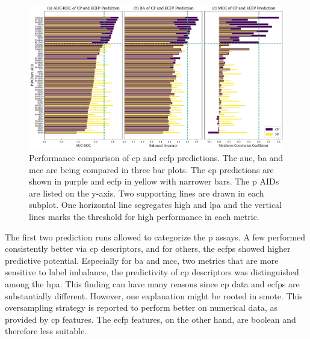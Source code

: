 \begin{figure}[H]
	\centering
	\includegraphics[width=\textwidth]{figures/cp_fp_comparison.pdf}
	\caption[Performance Comparison of \ac{cp} and \ac{ecfp} Predictions]{Performance comparison of \ac{cp} and \ac{ecfp} predictions. The \ac{auc}, \acf{ba} and \acf{mcc} are being compared in three bar plots. The \ac{cp} predictions are shown in purple and \ac{ecfp} in yellow with narrower bars. The \acl{p} AIDs are listed on the y-axis. Two supporting lines are drawn in each subplot. One horizontal line segregates high and \acl{lpa} and the vertical lines marks the threshold for high performance in each metric.}
	\label{fig:absperffpcp}
\end{figure}\noindent
The first two prediction runs allowed to categorize the \acl{p} assays. A few performed consistently better via \ac{cp} descriptors, and for others, the \acp{ecfp} showed higher predictive potential. Especially for \acl{ba} and \acl{mcc}, two metrics that are more sensitive to label imbalance, the predictivity of \ac{cp} descriptors was distinguished among the \acl{hpa}. This finding can have many reasons since \ac{cp} data and \acp{ecfp} are substantially different. However, one explanation might be rooted in \ac{smote}. This oversampling strategy is reported to perform better on numerical data, as provided by \ac{cp} features. The \ac{ecfp} features, on the other hand, are boolean and therefore less suitable.\\


